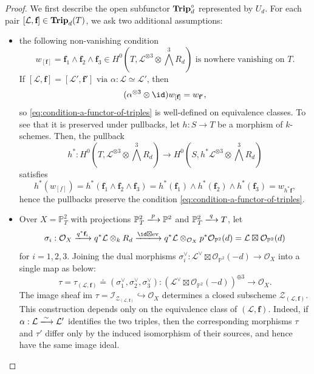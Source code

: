 \documentclass[11pt]{amsart} %
\newcommand{\lar}{\longrightarrow}
\theoremstyle{definition}
\def\Trip{{\bf Trip}}
\begin{document}
\begin{proof}
We first describe the open subfunctor $\Trip_d^\circ$ represented by
$U_d$. For each pair $[\mathcal{L}, \textbf{f}] \in \Trip_d(T)$, we ask two additional assumptions:
\begin{itemize}
    \item[(a)] the following non-vanishing condition
    \begin{equation}\label{eq:condition-a-functor-of-triples}
    w_{[\textbf{f}]} = \textbf{f}_1 \wedge \textbf{f}_2 \wedge \textbf{f}_3 \in H^0\left(T, \mathcal{L}^{\otimes 3} \otimes \bigwedge^3 R_d \right) \text{ is nowhere vanishing on }T.    
    \end{equation}
    If $[\mathcal{L}, \textbf{f}] = [\mathcal{L}', \textbf{f}'] \text{ via } \alpha : \mathcal{L} \simeq \mathcal{L}'$, then 
    $$
    (\alpha^{\otimes 3} \otimes \id) w_{
    [\textbf{f}]} = w_{\textbf{f}'},
    $$
    so \eqref{eq:condition-a-functor-of-triples} is well-defined on equivalence classes. To see that it is preserved under pullbacks, let $h: S \lar T$ be a morphism of $k$-schemes. Then, the pullback
    $$
    h^* : H^0\left(T, \mathcal{L}^{\otimes 3} \otimes \bigwedge^3 R_d \right) \lar H^0\left(S, h^*\mathcal{L}^{\otimes 3} \otimes \bigwedge^3 R_d\right)
    $$
    satisfies
    $$
    h^*(w_{[f]}) = h^*(\textbf{f}_1 \wedge \textbf{f}_2 \wedge \textbf{f}_3) = h^*(\textbf{f}_1) \wedge h^*(\textbf{f}_2) \wedge h^*(\textbf{f}_3) = w_{h^*\textbf{f}},
    $$
    hence the pullbacks preserve the condition \eqref{eq:condition-a-functor-of-triples}.
    \item[(b)] Over $X = \mathbb{P}^2_T$ with projections $\mathbb{P}^2_T \xlongrightarrow{p} \mathbb{P}^2$ and $\mathbb{P}^2_T \xlongrightarrow{q} T$, let
    $$
    \sigma_i : \mathcal{O}_{X} \xlongrightarrow{q^*\textbf{f}_i} q^* \mathcal{L} \otimes_k R_d \xlongrightarrow{\id \boxtimes \text{ev}} q^* \mathcal{L} \otimes_{\mathcal{O}_X} p^* \mathcal{O}_{\mathbb{P}^2}(d) = \mathcal{L} \boxtimes \mathcal{O}_{\mathbb{P}^2}(d)
    $$
    for $i =1, 2, 3$. Joining the dual morphisms $\sigma_i^{\vee} : \mathcal{L}^\vee \boxtimes \mathcal{O}_{\mathbb{P}^2}(-d) \lar \mathcal{O}_X$ into a single map as below:
    $$
    \tau = \tau_{(\mathcal{L}, \textbf{f})} \doteq (\sigma_1^\vee, \sigma_2^\vee, \sigma_3^\vee) : (\mathcal{L}^\vee \boxtimes \mathcal{O}_{\mathbb{P}^2}(-d))^{\oplus 3} \lar \mathcal{O}_X.
    $$
    The image sheaf $\text{im }\tau = \mathcal{I}_{\mathcal{Z}_{(\mathcal{L}, \textbf{f})}} \hookrightarrow \mathcal{O}_X$ determines a closed subscheme $\mathcal{Z}_{(\mathcal{L}, \textbf{f})}$. This construction depends only on the equivalence class of
$(\mathcal L,\mathbf f)$. Indeed, if
$\alpha:\mathcal L\xlongrightarrow{\sim}\mathcal L'$ identifies the two
triples, then the corresponding morphisms $\tau$ and $\tau'$ differ
only by the induced isomorphism of their sources, and hence have the
same image ideal.


\end{itemize}
\end{proof}
\end{document}
